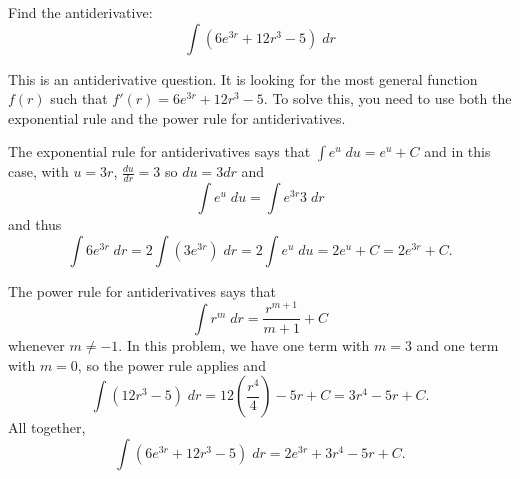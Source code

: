 \documentclass{ximera}
\author{Emma Smith Zbarsky}
\begin{document}
\begin{exercise}

Find the antiderivative: \[\int(6e^{3r} +12r^3 -5)\; dr\]


\begin{hint}
This is an antiderivative question. It is looking for the most general
function $f(r)$ such that $f'(r) = 6e^{3r}+12r^3-5$. To solve this, you
need to use both the exponential rule and the power rule for
antiderivatives.
\end{hint}


\begin{hint}
The exponential rule for antiderivatives says that
$\int e^u \; du = e^u+C$ and in this case, with $u= 3r$,
$\frac{du}{dr} = 3$ so $du = 3dr$ and
\[\int e^{u}\; du = \int e^{3r} 3\; dr\] and thus
\[\int 6e^{3r}\; dr = 2 \int \left(3e^{3r}\right)\; dr = 2\int e^u\; du = 2e^u +C = 2e^{3r}+C.\]

The power rule for antiderivatives says that
\[\int r^m \; dr = \frac{r^{m+1}}{m+1}+C\] whenever $m\neq -1$. In this
problem, we have one term with $m=3$ and one term with $m=0$, so the
power rule applies and
\[\int (12r^3-5)\; dr = 12\left(\frac{r^4}{4}\right)-5r+C = 3r^4-5r+C.\]
All together, \[\int (6e^{3r}+12r^3-5)\; dr = 2e^{3r}+3r^4-5r+C.\]
\end{hint}


\begin{multipleChoice}
\end{multipleChoice}

\end{exercise}
\end{document}
